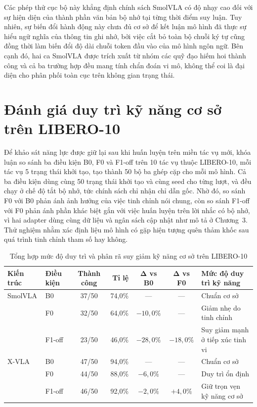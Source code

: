 Các phép thử cục bộ này khẳng định chính sách SmolVLA có độ nhạy cao đối với sự hiện diện của thành phần văn bản bộ nhớ tại từng thời điểm suy luận. Tuy nhiên, sự biến đổi hành động này chưa đủ cơ sở để kết luận mô hình đã thực sự hiểu ngữ nghĩa của thông tin ghi nhớ, bởi việc cắt bỏ toàn bộ chuỗi ký tự cũng đồng thời làm biến đổi độ dài chuỗi token đầu vào của mô hình ngôn ngữ. Bên cạnh đó, hai ca SmolVLA được trích xuất từ nhóm các quỹ đạo hiếm hoi thành công và cả ba trường hợp đều mang tính chẩn đoán vi mô, không thể coi là đại diện cho phân phối toàn cục trên không gian trạng thái.

\section{Đánh giá duy trì kỹ năng cơ sở trên LIBERO-10}
\label{sec:e6-retention}

Để khảo sát năng lực được giữ lại sau khi huấn luyện trên miền tác vụ mới, khóa luận so sánh ba điều kiện B0, F0 và F1-off trên 10 tác vụ thuộc LIBERO-10, mỗi tác vụ 5 trạng thái khởi tạo, tạo thành 50 bộ ba ghép cặp cho mỗi mô hình. Cả ba điều kiện dùng cùng 50 trạng thái khởi tạo và cùng seed cho từng lượt, và đều chạy ở chế độ tắt bộ nhớ, tức chính sách chỉ nhận chỉ dẫn gốc. Nhờ đó, so sánh F0 với B0 phản ánh ảnh hưởng của việc tinh chỉnh nói chung, còn so sánh F1-off với F0 phản ánh phần khác biệt gắn với việc huấn luyện trên lời nhắc có bộ nhớ, vì hai adapter dùng cùng dữ liệu và ngân sách cập nhật như mô tả ở Chương~3. Thử nghiệm nhằm xác định liệu mô hình có gặp hiện tượng quên thảm khốc sau quá trình tinh chỉnh tham số hay không.

\begin{table}[htbp]
\centering\small
\caption{Tổng hợp mức độ duy trì và phân rã suy giảm kỹ năng cơ sở trên LIBERO-10}
\label{tab:e6-retention-combined}
\label{tab:e6-retention-results}
\label{tab:xvla-e6-results}
\setlength{\tabcolsep}{4pt}
\begin{tabular}{l|l|c|r|c|c|>{\raggedright\arraybackslash}p{4.2cm}}
\toprule
\textbf{Kiến trúc} & \textbf{Điều kiện} & \textbf{Thành công} & \textbf{Tỉ lệ} & $\mathbf{\Delta}$ \textbf{vs B0} & $\mathbf{\Delta}$ \textbf{vs F0} & \textbf{Mức độ duy trì kỹ năng} \\
\midrule
SmolVLA & B0     & 37/50 & 74{,}0\% & —        & —        & Chuẩn cơ sở \\
        & F0     & 32/50 & 64{,}0\% & $-10{,}0\%$ & —        & Giảm nhẹ do tinh chỉnh \\
        & F1-off & 23/50 & 46{,}0\% & $-28{,}0\%$ & $-18{,}0\%$ & Suy giảm mạnh ở tiếp xúc tinh vi \\
\midrule
X-VLA   & B0     & 47/50 & 94{,}0\% & —        & —        & Chuẩn cơ sở \\
        & F0     & 44/50 & 88{,}0\% & $-6{,}0\%$  & —        & Duy trì ổn định \\
        & F1-off & 46/50 & 92{,}0\% & $-2{,}0\%$  & $+4{,}0\%$  & Giữ trọn vẹn kỹ năng cơ sở \\
\bottomrule
\end{tabular}
\end{table}

